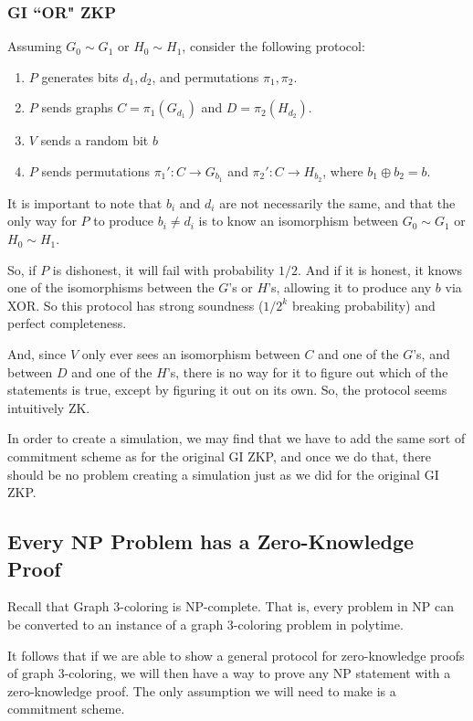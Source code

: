 \documentclass[11pt]{article}
\newcommand{\NP}{\mathbf{NP}}
\begin{document}
\subsubsection{GI ``OR" ZKP}
Assuming \(G_0\sim G_1\) or \(H_0\sim H_1\), consider the following protocol:
\begin{enumerate}
\item \(P\) generates bits \(d_1,d_2\), and permutations \(\pi_1,\pi_2\).
\item \(P\) sends graphs \(C=\pi_1(G_{d_1})\) and \(D=\pi_2(H_{d_2})\).
\item \(V\) sends a random bit \(b\)
\item \(P\) sends permutations \(\pi_1': C\to G_{b_1}\) and \(\pi_2': C\to H_{b_2}\), where \(b_1\oplus b_2=b\).
\end{enumerate}

It is important to note that \(b_i\) and \(d_i\) are not necessarily the same, and that the only way for \(P\) to produce \(b_i\ne d_i\) is to know an isomorphism between \(G_0\sim G_1\) or \(H_0\sim H_1\).\medskip

So, if \(P\) is dishonest, it will fail with probability \(1/2\). And if it is honest, it knows one of the isomorphisms between the \(G\)'s or \(H\)'s, allowing it to produce any \(b\) via XOR. So this protocol has strong soundness (\(1/2^k\) breaking probability) and perfect completeness.\medskip

And, since \(V\) only ever sees an isomorphism between \(C\) and one of the \(G\)'s, and between \(D\) and one of the \(H\)'s, there is no way for it to figure out which of the statements is true, except by figuring it out on its own. So, the protocol seems intuitively ZK.\smallskip

 In order to create a simulation, we may find that we have to add the same sort of commitment scheme as for the original GI ZKP, and once we do that, there should be no problem creating a simulation just as we did for the original GI ZKP.



\subsection{Every \(\NP\) Problem has a Zero-Knowledge Proof}
Recall that Graph 3-coloring is NP-complete. That is, every problem in NP can be converted to an instance of a graph 3-coloring problem in polytime.\smallskip

It follows that if we are able to show a general protocol for zero-knowledge proofs of graph 3-coloring, we will then have a way to prove any NP statement with a zero-knowledge proof. The only assumption we will need to make is a commitment scheme.\bigskip
\end{document}
